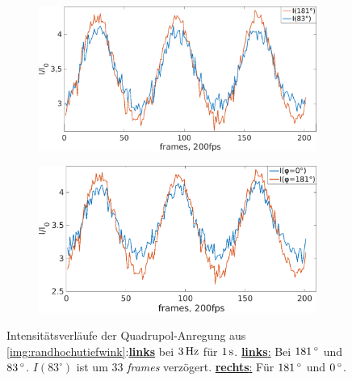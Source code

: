 \documentclass[numbers=noenddot,a4paper,notitlepage,twoside,BCOR15mm]{scrbook}
\newcommand{\degree}{^\circ}
\newcommand{\tilt}[1]{\textit{#1}}
\newcommand{\fett}[1]{\textbf{#1}}
\begin{document}
						\begin{figure}[!t]
							\centering
							\begin{subfigure}{0.49\textwidth}
								\centering
								\includegraphics[width=\textwidth,height=0.65\textwidth]{figs/auswertung/plasmaglw/intens83u180quadinphase3Hz1sek.png}
							\end{subfigure}
							\begin{subfigure}{0.49\textwidth}
								\centering
								\includegraphics[width=\textwidth,height=0.65\textwidth]{figs/auswertung/plasmaglw/intens0u180quad3Hz1sek.png}
							\end{subfigure}
							\caption{Intensitätsverläufe der Quadrupol-Anregung aus \autoref{img:randhochutiefwink}:\underline{\fett{links}} bei $\unit[3]{Hz}$ für $\unit[1]{s}$. \underline{\fett{links}:} Bei $\unit[181]{\degree}$ und $\unit[83]{\degree}$. $I\left(83\degree\right)$ ist um 33 \tilt{frames} verzögert. \underline{\fett{rechts}:} Für $\unit[181]{\degree}$  und $\unit[0]{\degree}$. }
							\label{img:intensquadhochwink}
						\end{figure}
\end{document}
